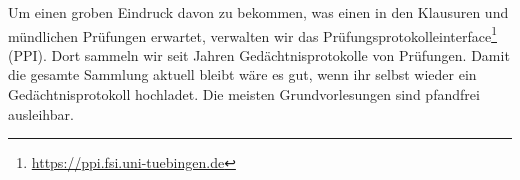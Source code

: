 Um einen groben Eindruck davon zu bekommen, was einen in den Klausuren und mündlichen Prüfungen erwartet, verwalten wir das Pr\"ufungsprotokolleinterface\footnote{\url{https://ppi.fsi.uni-tuebingen.de}} (PPI). Dort sammeln wir seit Jahren Ged\"achtnisprotokolle von Prüfungen. Damit die gesamte Sammlung aktuell bleibt wäre es gut, wenn ihr selbst wieder ein Gedächtnisprotokoll hochladet. Die meisten Grundvorlesungen sind pfandfrei ausleihbar.	%
